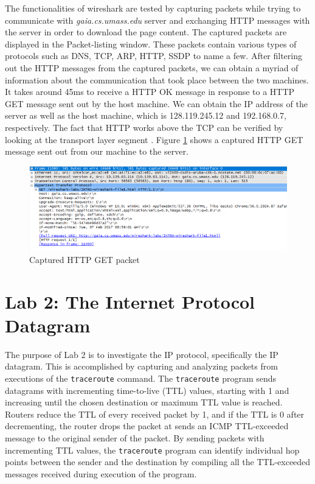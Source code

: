 \documentclass[10pt]{IEEEtran}
\begin{document}
 The functionalities of wireshark are tested by capturing packets while trying to communicate with \textit{gaia.cs.umass.edu} server and exchanging HTTP messages with the server in order to download the page content. The captured packets are displayed in the Packet-listing window. These packets contain various types of protocols such as DNS, TCP, ARP, HTTP, SSDP to name a few. After filtering out the HTTP messages from the captured packets, we can obtain a myriad of information about the communication that took place between the two machines. It takes around 45ms to receive a HTTP OK message in response to a HTTP GET message sent out by the host machine. We can obtain the IP address of the server as well as the host machine, which is 128.119.245.12 and 192.168.0.7, respectively. The fact that HTTP works above the TCP can be verified by looking at the transport layer segment . Figure \ref{fig:HTTPpacket} shows a captured HTTP GET message sent out from our machine to the server.  \\

\begin{figure}[h!]
	\includegraphics[width=\linewidth]{HTTP_GET.png}
	\caption{Captured HTTP GET packet}
	\label{fig:HTTPpacket}
\end{figure}

\section{Lab 2: The Internet Protocol Datagram}

 The purpose of Lab 2 is to investigate the IP protocol, specifically the IP datagram. This is accomplished by capturing and analyzing packets from executions of the {\tt traceroute} command. The {\tt traceroute} program sends datagrams with incrementing time-to-live (TTL) values, starting with 1 and increasing until the chosen destination or maximum TTL value is reached. Routers reduce the TTL of every received packet by 1, and if the TTL is 0 after decrementing, the router drops the packet at sends an ICMP TTL-exceeded message to the original sender of the packet. By sending packets with incrementing TTL values, the {\tt traceroute} program can identify individual hop points between the sender and the destination by compiling all the TTL-exceeded messages received during execution of the program.\\
 
\end{document}

